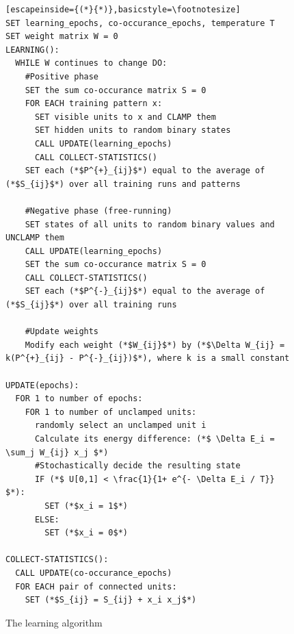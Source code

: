 \documentclass[12pt,twoside]{article}
\theoremstyle{plain}
\theoremstyle{definition}
\theoremstyle{remark}
\begin{document}
\begin{figure}[h]
\begin{lstlisting}[escapeinside={(*}{*)},basicstyle=\footnotesize]
SET learning_epochs, co-occurance_epochs, temperature T
SET weight matrix W = 0
LEARNING():
  WHILE W continues to change DO:
    #Positive phase
    SET the sum co-occurance matrix S = 0
    FOR EACH training pattern x:
      SET visible units to x and CLAMP them
      SET hidden units to random binary states
      CALL UPDATE(learning_epochs)
      CALL COLLECT-STATISTICS()
    SET each (*$P^{+}_{ij}$*) equal to the average of (*$S_{ij}$*) over all training runs and patterns

    #Negative phase (free-running)
    SET states of all units to random binary values and UNCLAMP them
    CALL UPDATE(learning_epochs)
    SET the sum co-occurance matrix S = 0
    CALL COLLECT-STATISTICS()
    SET each (*$P^{-}_{ij}$*) equal to the average of (*$S_{ij}$*) over all training runs

    #Update weights
    Modify each weight (*$W_{ij}$*) by (*$\Delta W_{ij} = k(P^{+}_{ij} - P^{-}_{ij})$*), where k is a small constant

UPDATE(epochs):
  FOR 1 to number of epochs:
    FOR 1 to number of unclamped units:
      randomly select an unclamped unit i
      Calculate its energy difference: (*$ \Delta E_i = \sum_j W_{ij} x_j $*)
      #Stochastically decide the resulting state
      IF (*$ U[0,1] < \frac{1}{1+ e^{- \Delta E_i / T}} $*):
        SET (*$x_i = 1$*)
      ELSE:
        SET (*$x_i = 0$*)

COLLECT-STATISTICS():
  CALL UPDATE(co-occurance_epochs)
  FOR EACH pair of connected units:
    SET (*$S_{ij} = S_{ij} + x_i x_j$*)
\end{lstlisting}
\caption{The learning algorithm}
\label{fig:learning-alg}
\end{figure}
\end{document}
